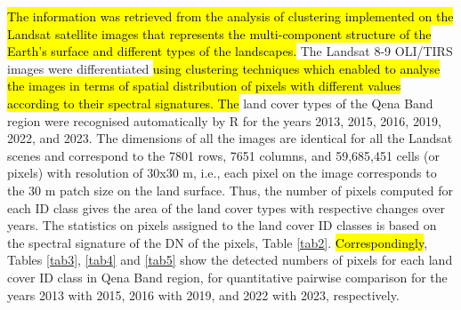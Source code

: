\documentclass[information,article,submit,pdftex,moreauthors]{Definitions/mdpi}
\begin{document}
\hl{The information was retrieved from the analysis of clustering implemented on the Landsat satellite images that represents the multi-component structure of the Earth's surface and different types of the landscapes. }The Landsat 8-9 OLI/TIRS images were differentiated \hl{using clustering techniques which enabled to analyse the images in terms of spatial distribution of pixels with different values according to their spectral signatures. The }land cover types of the Qena Band region were recognised automatically by R for the years 2013, 2015, 2016, 2019, 2022, and 2023. The dimensions of all the images are identical for all the Landsat scenes and correspond to the 7801 rows, 7651 columns, and 59,685,451 cells (or pixels) with resolution of 30x30 m, i.e., each pixel on the image corresponds to the 30 m patch size on the land surface. Thus, the number of pixels computed for each ID class gives the area of the land cover types with respective changes over years. The statistics on pixels assigned to the land cover ID classes is based on the spectral signature of the DN of the pixels, Table \ref{tab2}. \hl{Correspondingly}, Tables \ref{tab3}, \ref{tab4} and \ref{tab5} show the detected numbers of pixels for each land cover ID class  in Qena Band region, for quantitative pairwise comparison for the years 2013 with 2015, 2016 with 2019, and 2022 with 2023, respectively. 
\end{document}
